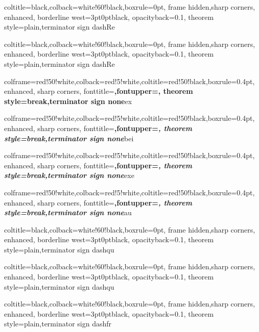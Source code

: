 %
{coltitle=black,colback=white!60!black,boxrule=0pt,
frame hidden,sharp corners, enhanced,
borderline west={3pt}{0pt}{black},
opacityback=0.1,
theorem style=plain,terminator sign dash}{Re}

%
{coltitle=black,colback=white!60!black,boxrule=0pt,
frame hidden,sharp corners, enhanced,
borderline west={3pt}{0pt}{black},
opacityback=0.1,
theorem style=plain,terminator sign dash}{Re}

%
{colframe=red!50!white,colback=red!5!white,coltitle=red!50!black,boxrule=0.4pt,
enhanced, sharp corners,
fonttitle=\upshape\bfseries,fontupper=\upshape,
theorem style=break,terminator sign none}{ex}

%
{colframe=red!50!white,colback=red!5!white,coltitle=red!50!black,boxrule=0.4pt,
enhanced, sharp corners,
fonttitle=\upshape\bfseries,fontupper=\itshape,
theorem style=break,terminator sign none}{bei}

%
{colframe=red!50!white,colback=red!5!white,coltitle=red!50!black,boxrule=0.4pt,
enhanced, sharp corners,
fonttitle=\upshape\bfseries,fontupper=\itshape,
theorem style=break,terminator sign none}{exe}

%
{colframe=red!50!white,colback=red!5!white,coltitle=red!50!black,boxrule=0.4pt,
enhanced, sharp corners,
fonttitle=\upshape\bfseries,fontupper=\itshape,
theorem style=break,terminator sign none}{au}

%
{coltitle=black,colback=white!60!black,boxrule=0pt,
frame hidden,sharp corners, enhanced,
borderline west={3pt}{0pt}{black},
opacityback=0.1,
theorem style=plain,terminator sign dash}{qu}

%
{coltitle=black,colback=white!60!black,boxrule=0pt,
frame hidden,sharp corners, enhanced,
borderline west={3pt}{0pt}{black},
opacityback=0.1,
theorem style=plain,terminator sign dash}{qu}

%
{coltitle=black,colback=white!60!black,boxrule=0pt,
frame hidden,sharp corners, enhanced,
borderline west={3pt}{0pt}{black},
opacityback=0.1,
theorem style=plain,terminator sign dash}{fr}

